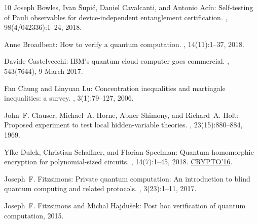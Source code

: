 \documentclass[11pt]{article}
\numberwithin{equation}{section}
\theoremstyle{definition}
\theoremstyle{plain}
\begin{document}
\begin{thebibliography}{10}
{\sc Joseph Bowles, Ivan \v{S}upi\'{c}, Daniel Cavalcanti, and Antonio
  Ac\'{i}n}: Self-testing of {P}auli observables for device-independent
  entanglement certification.
, 98(4/042336):1--24, 2018.

{\sc Anne Broadbent}: How to verify a quantum computation.
, 14(11):1--37, 2018.

{\sc Davide Castelvecchi}: {IBM}'s quantum cloud computer goes commercial.
, 543(7644), 9 March 2017.

{\sc Fan Chung and Linyuan Lu}: Concentration inequalities and martingale
  inequalities: a survey.
, 3(1):79--127, 2006.
\newblock [\epfmtdoi{10.1080/15427951.2006.10129115}]

{\sc John~F. Clauser, Michael~A. Horne, Abner Shimony, and Richard~A. Holt}:
  Proposed experiment to test local hidden-variable theories.
, 23(15):880--884, 1969.

{\sc Yfke Dulek, Christian Schaffner, and Florian Speelman}: Quantum
  homomorphic encryption for polynomial-sized circuits.
, 14(7):1--45, 2018.
\newblock \prelim
  \href{http://doi.org/10.1007/978-3-662-53015-3\_1}{CRYPTO'16}.

{\sc Joseph~F. Fitzsimons}: Private quantum computation: {A}n introduction to
  blind quantum computing and related protocols.
, 3(23):1--11, 2017.

{\sc Joseph~F. Fitzsimons and Michal Hajdu\v{s}ek}: Post hoc verification of
  quantum computation, 2015.


\end{thebibliography}
\end{document}
